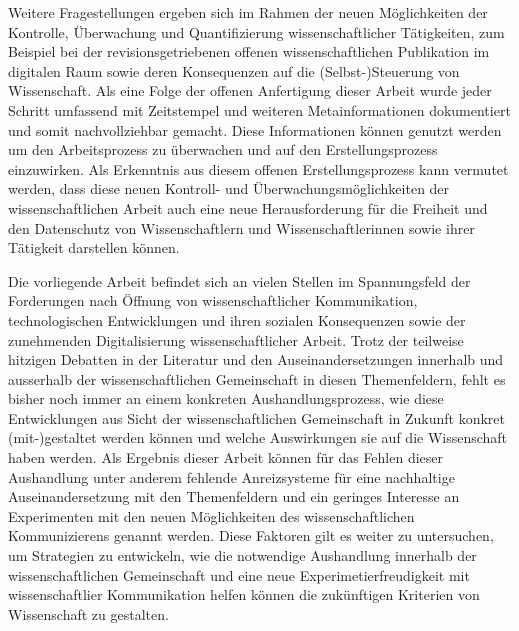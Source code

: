Weitere Fragestellungen ergeben sich im Rahmen der neuen Möglichkeiten der Kontrolle, Überwachung und Quantifizierung wissenschaftlicher Tätigkeiten, zum Beispiel bei der revisionsgetriebenen offenen wissenschaftlichen Publikation im digitalen Raum sowie deren Konsequenzen auf die (Selbst-)Steuerung von Wissenschaft. Als eine Folge der offenen Anfertigung dieser Arbeit wurde jeder Schritt umfassend mit Zeitstempel und weiteren Metainformationen dokumentiert und somit nachvollziehbar gemacht. Diese Informationen können genutzt werden um den Arbeitsprozess zu überwachen und auf den Erstellungsprozess einzuwirken. Als Erkenntnis aus diesem offenen Erstellungsprozess kann vermutet werden, dass diese neuen Kontroll- und Überwachungsmöglichkeiten der wissenschaftlichen Arbeit auch eine neue Herausforderung für die Freiheit und den Datenschutz von Wissenschaftlern und Wissenschaftlerinnen sowie ihrer Tätigkeit darstellen können.

Die vorliegende Arbeit befindet sich an vielen Stellen im Spannungsfeld der Forderungen nach Öffnung von wissenschaftlicher Kommunikation, technologischen Entwicklungen und ihren sozialen Konsequenzen sowie der zunehmenden Digitalisierung wissenschaftlicher Arbeit. Trotz der teilweise hitzigen Debatten in der Literatur und den Auseinandersetzungen innerhalb und ausserhalb der wissenschaftlichen Gemeinschaft in diesen Themenfeldern, fehlt es bisher noch immer an einem konkreten Aushandlungsprozess, wie diese Entwicklungen aus Sicht der wissenschaftlichen Gemeinschaft in Zukunft konkret (mit-)gestaltet werden können und welche Auswirkungen sie auf die Wissenschaft haben werden. Als Ergebnis dieser Arbeit können für das Fehlen dieser Aushandlung unter anderem fehlende Anreizsysteme für eine nachhaltige Auseinandersetzung mit den Themenfeldern und ein geringes Interesse an Experimenten mit den neuen Möglichkeiten des wissenschaftlichen Kommunizierens genannt werden. Diese Faktoren gilt es weiter zu untersuchen, um Strategien zu entwickeln, wie die notwendige Aushandlung innerhalb der wissenschaftlichen Gemeinschaft und eine neue Experimetierfreudigkeit mit wissenschaftlier Kommunikation helfen können die zukünftigen Kriterien von Wissenschaft zu gestalten.
